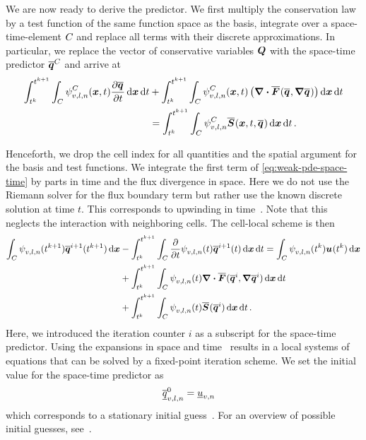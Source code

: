 We are now ready to derive the predictor.
We first multiply the conservation law by a test function of the same function space as the basis, integrate over a space-time-element $C_{}$ and replace all terms with their discrete approximations.
In particular, we replace the vector of conservative variables $\bm{Q}$ with the space-time predictor $\stpredictor[\cell]$ and arrive at
\begin{align}\label{eq:weak-pde-space-time}
\begin{split}
\intdt{\intdcell{
    \sttestfunction[\cell][v,l,n](\bm{x}, t)
    \pdv{\stpredictor}{t}
}}
&+
\intdt{\intdcell{
    \sttestfunction[\cell][v,l,n](\bm{x}, t)
    \left(
      \divergence{\stflux(\stpredictor, \gradient{\stpredictor})}
    \right)
}}
\\&=
\intdt{\intdcell{
  \sttestfunction[\cell][v,l,n] \stsource(\bm{x}, t, \stpredictor)
}}.
\end{split}
\end{align}

Henceforth, we drop the cell index for all quantities and the spatial argument for the basis and test functions.
We integrate the first term of \cref{eq:weak-pde-space-time} by parts in time and the flux divergence in space.
Here we do not use the Riemann solver for the flux boundary term but rather use the known discrete solution at time $t$.
This corresponds to upwinding in time~\cite{dumbser2008unified}.
Note that this neglects the interaction with neighboring cells.
The cell-local scheme is then
\begin{align}\label{eq:space-time-predictor}
\begin{split}
\intdcell{
  \sttestfunction[][v,l,n] (\nextTime) \stpredictor[i+1](\nextTime)
}
&-
\intdt{\intdcell{
    \pdv{}{t} \sttestfunction[][v,l,n] (t) \stpredictor[i+1](t)
}}
= 
\intdcell{
  \sttestfunction[][v,l,n] (\curTime) \ssol (\curTime)
}
\\&+
\intdt{\intdcell{
    \sttestfunction[][v,l,n] (t) \divergence{\stflux(\stpredictor[i], \gradient{\stpredictor[i]})}
}}
\\&+
\intdt{\intdcell{
    \sttestfunction[][v,l,n] (t) \stsource(\stpredictor[i])
}}.\raisetag{0.8cm}
\end{split}
\end{align}
Here, we introduced the iteration counter $i$ as a subscript for the space-time predictor.
Using the expansions in space and time~ results in a local systems of equations that can be solved by a fixed-point iteration scheme.
We set the initial value for the space-time predictor as
\begin{equation}
  \label{eq:initial-guess}
\quad \stpredictorCoeff[0][v,l,n] = \ssolCoeff[][v,n]
\end{equation}
which corresponds to a stationary initial guess~\cite{dumbser2008unified}.
For an overview of possible initial guesses, see~\cite{dumbser2018efficient}.

